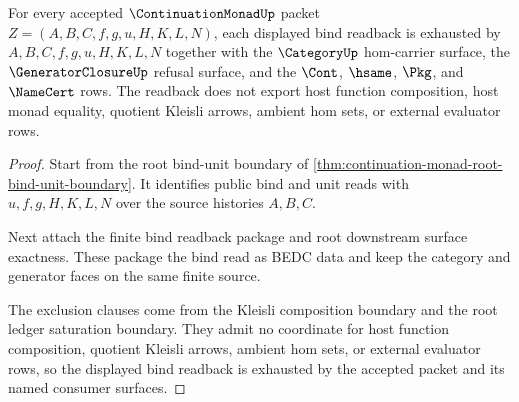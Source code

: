 \begin{theorem}
\label{thm:continuation-monad-displayed-bind-readback-exhaustion}
For every accepted $\ContinuationMonadUp$ packet $Z=(A,B,C,f,g,u,H,K,L,N)$, each displayed bind readback is exhausted by $A,B,C,f,g,u,H,K,L,N$ together with the $\CategoryUp$ hom-carrier surface, the $\GeneratorClosureUp$ refusal surface, and the $\Cont$, $\hsame$, $\Pkg$, and $\NameCert$ rows. The readback does not export host function composition, host monad equality, quotient Kleisli arrows, ambient hom sets, or external evaluator rows.
\end{theorem}
\begin{proof}
Start from the root bind-unit boundary of \autoref{thm:continuation-monad-root-bind-unit-boundary}. It identifies public bind and unit reads with $u,f,g,H,K,L,N$ over the source histories $A,B,C$.

Next attach the finite bind readback package and root downstream surface exactness. These package the bind read as BEDC data and keep the category and generator faces on the same finite source.

The exclusion clauses come from the Kleisli composition boundary and the root ledger saturation boundary. They admit no coordinate for host function composition, quotient Kleisli arrows, ambient hom sets, or external evaluator rows, so the displayed bind readback is exhausted by the accepted packet and its named consumer surfaces.
\end{proof}

